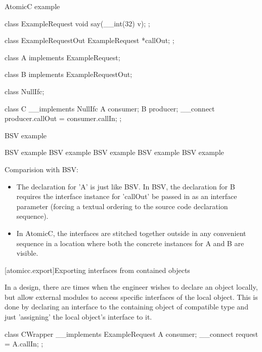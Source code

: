 \begin{example}
\begin{multicols}{2}
AtomicC example
\begin{codeblock}
     class ExampleRequest {
         void say(__int(32) v);
     };

     class ExampleRequestOut {
         ExampleRequest *callOut;
     };

     class A implements ExampleRequest;

     class B implements ExampleRequestOut;

     class NullIfc;

     class C __implements NullIfc {
         A consumer;
         B producer;
         __connect producer.callOut = consumer.callIn;
     };
\end{codeblock}
\columnbreak
BSV example
\begin{codeblock}
    BSV example
    BSV example
    BSV example
    BSV example
    BSV example
\end{codeblock}
\end{multicols}
\end{example}

Comparision with BSV:
\begin{itemize}
\item The declaration for 'A' is just like BSV.
In BSV, the declaration for B requires the interface instance for 'callOut' be passed in as
an interface parameter (forcing a textual ordering to the source code
declaration sequence).
\item In AtomicC, the interfaces are stitched together outside in any
convenient sequence in a location where both the concrete instances
for A and B are visible.
\end{itemize}

[atomicc.export]{Exporting interfaces from contained objects}

In a design, there are times when the engineer wishes to declare an object locally,
but allow external modules to access specific interfaces of the local object.
This is done by declaring an interface to the containing object of compatible
type and just 'assigning' the local object's interface to it.

\begin{example}
\begin{codeblock}
     class CWrapper __implements ExampleRequest {
         A consumer;
         __connect request = A.callIn;
      };
\end{codeblock}
\end{example}

